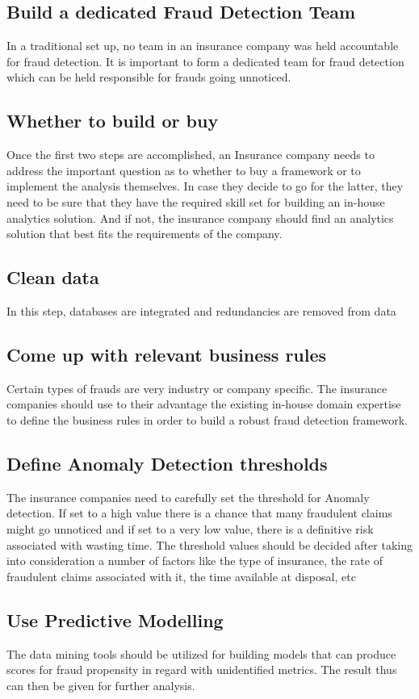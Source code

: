 \documentclass[sigconf]{acmart}
\begin{document}
\subsection{Build a dedicated Fraud Detection Team}
In a traditional set up, no team in an insurance company was held accountable for fraud detection. It is important to form a dedicated team for fraud detection which can be held responsible for frauds going unnoticed.
\subsection{Whether to build or buy	}
Once the first two steps are accomplished, an Insurance company needs to address the important question as to whether to buy a framework or to implement the analysis themselves. In case they decide to go for the latter, they need to be sure that they have the required skill set for building an in-house analytics solution. And if not, the insurance company should find an analytics solution that best fits the requirements of the company. 
\subsection{Clean data}
In this step, databases are integrated and redundancies are removed from data 
\subsection{Come up with relevant business rules}
Certain types of frauds are very industry or company specific. The insurance companies should use to their advantage the existing in-house domain expertise to define the business rules in order to build a robust fraud detection framework.
\subsection{Define Anomaly Detection thresholds}
The insurance companies need to carefully set the threshold for Anomaly detection. If set to a high value there is a chance that many fraudulent claims might go unnoticed and if set to a very low value, there is a definitive risk associated with wasting time. The threshold values should be decided after taking into consideration a number of factors like the type of insurance, the rate of fraudulent claims associated with it, the time available at disposal, etc
\subsection{Use Predictive Modelling}
The data mining tools should be utilized for building models that can produce scores for fraud propensity in regard with unidentified metrics. The result thus can then be given for further analysis.
\end{document}
